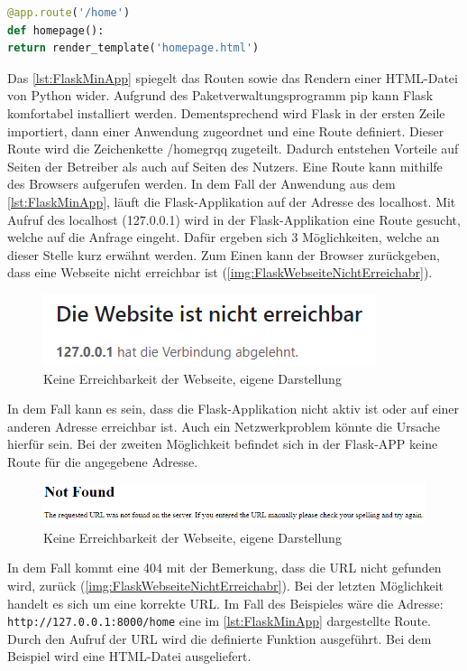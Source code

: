 \documentclass[a4paper,titlepage,halfparskip,12pt]{scrreprt}
\begin{document}
\begin{onehalfspacing}
\begin{lstlisting}[language=Python,caption=Example Listing of Flask Python,label={lst:FlaskMinApp}]
@app.route('/home')
def homepage():
return render_template('homepage.html')
\end{lstlisting}
Das \autoref{lst:FlaskMinApp} spiegelt das Routen sowie das Rendern einer \ac{HTML}-Datei von Python wider. Aufgrund des Paketverwaltungsprogramm pip kann Flask komfortabel installiert werden. Dementsprechend wird Flask in der ersten Zeile importiert, dann einer Anwendung zugeordnet und eine Route definiert. Dieser Route wird die Zeichenkette \glqq /homegrqq{} zugeteilt. Dadurch entstehen Vorteile auf Seiten der Betreiber als auch auf Seiten des Nutzers. Eine Route kann mithilfe des Browsers aufgerufen werden. In dem Fall der Anwendung aus dem \autoref{lst:FlaskMinApp}, läuft die Flask-Applikation auf der Adresse des localhost. Mit Aufruf des localhost (127.0.0.1) wird in der Flask-Applikation eine Route gesucht, welche auf die Anfrage eingeht. Dafür ergeben sich 3 Möglichkeiten, welche an dieser Stelle kurz erwähnt werden. Zum Einen kann der Browser zurückgeben, dass eine Webseite nicht erreichbar ist (\autoref{img:FlaskWebseiteNichtErreichabr}). 
\begin{figure}[h]
	\centering
	\includegraphics[scale=1.5]{images/WebseiteNichtErreichbar}
	\caption{Keine Erreichbarkeit der Webseite, eigene Darstellung}
	\label{img:FlaskWebseiteNichtErreichabr}
\end{figure}
In dem Fall kann es sein, dass die Flask-Applikation nicht aktiv ist oder auf einer anderen Adresse erreichbar ist. Auch ein Netzwerkproblem könnte die Ursache hierfür sein. Bei der zweiten Möglichkeit befindet sich in der Flask-APP keine Route für die angegebene Adresse.
\begin{figure}[h]
	\centering
	\includegraphics[scale=1.0]{images/NotFound}
	\caption{Keine Erreichbarkeit der Webseite, eigene Darstellung}
	\label{img:FlaskWebseiteNotFound}
\end{figure}
In dem Fall kommt eine 404 mit der Bemerkung, dass die URL nicht gefunden wird, zurück (\autoref{img:FlaskWebseiteNichtErreichabr}). Bei der letzten Möglichkeit handelt es sich um eine korrekte URL. Im Fall des Beispieles wäre die Adresse: \texttt{http://127.0.0.1:8000/home} eine im \autoref{lst:FlaskMinApp} dargestellte Route. Durch den Aufruf der URL wird die definierte Funktion ausgeführt. Bei dem Beispiel wird eine HTML-Datei ausgeliefert.

\end{onehalfspacing}
\end{document}
